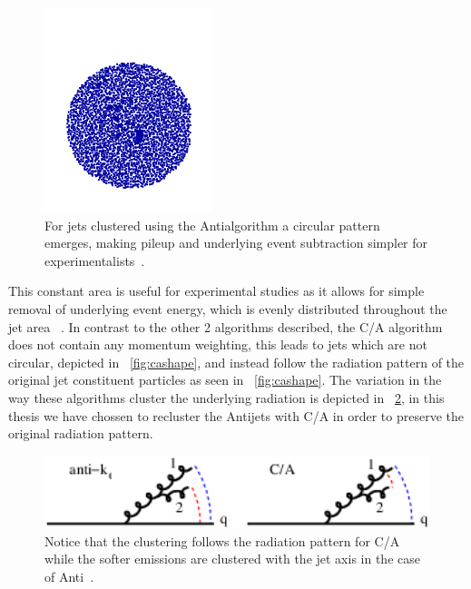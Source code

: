 \begin{figure}[htb]
\centering
\includegraphics[width=.40\textwidth]{visuals/figs_subjet-plots-antikt.png}
\caption{For jets clustered using the Anti\kt algorithm a circular pattern emerges, making pileup and underlying event subtraction simpler for experimentalists~\cite{Dreyer:2018nbf}.}
\label{fig:antikt}
\end{figure}



This constant area is useful for experimental studies as it allows for simple removal of underlying event energy, which is evenly distributed throughout the jet area ~\cite{Dreyer:2018nbf}. In contrast to the other 2 algorithms described, the C/A algorithm does not contain any momentum weighting, this leads to jets which are not circular, depicted in ~\ref{fig:cashape}, and instead follow the radiation pattern of the original jet constituent particles as seen in ~\ref{fig:cashape}. The variation in the way these algorithms cluster the underlying radiation is depicted in ~\ref{fig:algclusterdiffs}, in this thesis we have chossen to recluster the Anti\kt jets with C/A in order to preserve the original radiation pattern.


\begin{figure}[htb]
\centering
\includegraphics[width=1.0\textwidth]{visuals/config-antikt-double-lund.png}
\caption{Notice that the clustering follows the radiation pattern for C/A while the softer emissions are clustered with the jet axis in the case of Anti\kt ~\cite{Dreyer:2018nbf}.}
\label{fig:algclusterdiffs}
\end{figure}


